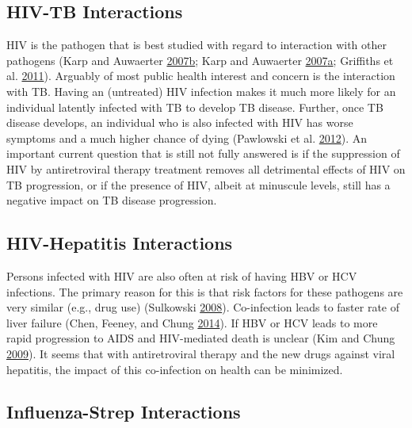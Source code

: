 \documentclass[]{book}
\theoremstyle{definition}
\theoremstyle{definition}
\theoremstyle{definition}
\theoremstyle{remark}
\begin{document}
\subsection{HIV-TB Interactions}\label{hiv-tb-interactions}

HIV is the pathogen that is best studied with regard to interaction with
other pathogens (Karp and Auwaerter
\protect\hyperlink{ref-karp07}{2007}\protect\hyperlink{ref-karp07}{b};
Karp and Auwaerter
\protect\hyperlink{ref-karp07a}{2007}\protect\hyperlink{ref-karp07a}{a};
Griffiths et al. \protect\hyperlink{ref-griffiths11}{2011}). Arguably of
most public health interest and concern is the interaction with TB.
Having an (untreated) HIV infection makes it much more likely for an
individual latently infected with TB to develop TB disease. Further,
once TB disease develops, an individual who is also infected with HIV
has worse symptoms and a much higher chance of dying (Pawlowski et al.
\protect\hyperlink{ref-pawlowski12}{2012}). An important current
question that is still not fully answered is if the suppression of HIV
by antiretroviral therapy treatment removes all detrimental effects of
HIV on TB progression, or if the presence of HIV, albeit at minuscule
levels, still has a negative impact on TB disease progression.

\subsection{HIV-Hepatitis
Interactions}\label{hiv-hepatitis-interactions}

Persons infected with HIV are also often at risk of having HBV or HCV
infections. The primary reason for this is that risk factors for these
pathogens are very similar (e.g., drug use) (Sulkowski
\protect\hyperlink{ref-sulkowski08}{2008}). Co-infection leads to faster
rate of liver failure (Chen, Feeney, and Chung
\protect\hyperlink{ref-chen14}{2014}). If HBV or HCV leads to more rapid
progression to AIDS and HIV-mediated death is unclear (Kim and Chung
\protect\hyperlink{ref-kim09}{2009}). It seems that with antiretroviral
therapy and the new drugs against viral hepatitis, the impact of this
co-infection on health can be minimized.

\subsection{Influenza-Strep
Interactions}\label{influenza-strep-interactions}
\end{document}
